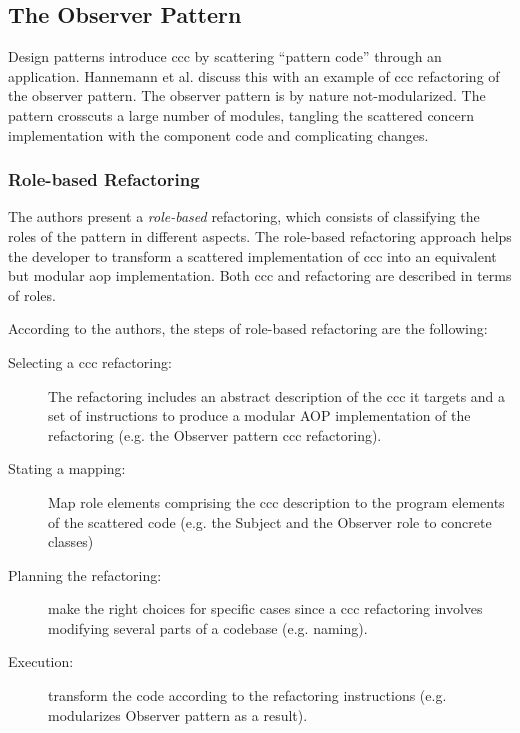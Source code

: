 \subsection{The Observer Pattern}\label{The Observer Pattern}
Design patterns introduce \ac{ccc} by scattering ``pattern code'' through an application.
Hannemann et al. \cite{hannemann2005role} discuss this with an example of \ac{ccc} refactoring of the observer pattern.
The observer pattern is by nature not-modularized. 
The pattern crosscuts a large number of modules, tangling the scattered concern implementation with the component code and complicating changes.

\subsubsection{Role-based Refactoring}
The authors present a \textit{role-based} refactoring, which consists of classifying the roles of the pattern in different aspects.
The role-based refactoring approach helps the developer to transform a scattered implementation of \ac{ccc} into an equivalent but modular \ac{aop} implementation. 
Both \ac{ccc} and refactoring are described in terms of roles. 

According to the authors\cite{hannemann2005role}, the steps of role-based refactoring are the following:
\begin{description}

	\item [Selecting a \ac{ccc} refactoring:] The refactoring includes an abstract description of the \ac{ccc} it targets and a set of instructions to produce a modular AOP implementation of the refactoring (e.g. the Observer pattern \ac{ccc} refactoring).

	\item [Stating a mapping:] Map role elements comprising the \ac{ccc} description to the program elements of the scattered code (e.g. the Subject and the Observer role to concrete classes)

	\item [Planning the refactoring:] make the right choices for specific cases since a \ac{ccc} refactoring involves modifying several parts of a codebase (e.g. naming).

	\item [Execution:] transform the code according to the refactoring instructions (e.g. modularizes Observer pattern as a result).
\end{description}

